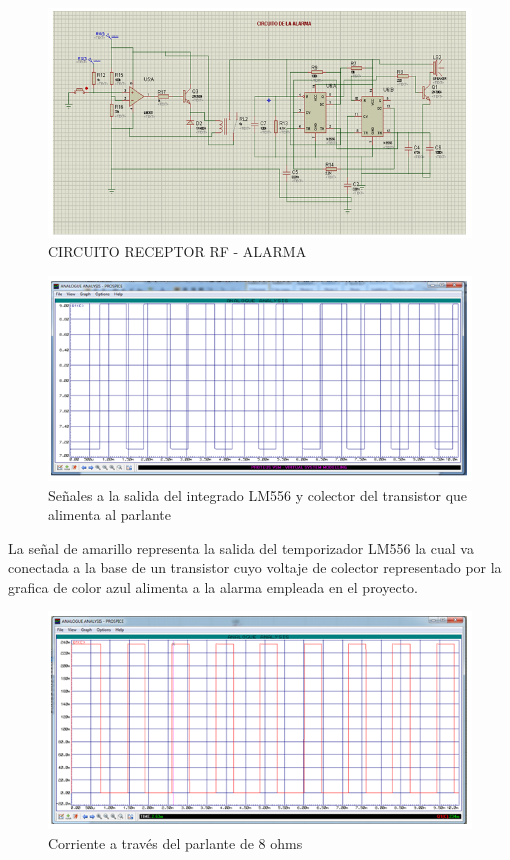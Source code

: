 \documentclass[a4paper,11pt]{article}
\begin{document}
\newpage
\begin{figure}[h]
	\caption{CIRCUITO RECEPTOR RF - ALARMA}
	\centering
	\includegraphics[width=0.8\linewidth]{./31}
\end{figure}


\begin{figure}[h]
	\caption{Señales a la salida del integrado LM556 y colector del transistor que alimenta al parlante}
	\centering
	\includegraphics[width=0.7\linewidth]{./32}
\end{figure}

La señal de amarillo representa la salida del temporizador LM556 la cual va conectada a la base de un transistor cuyo voltaje de colector representado por la grafica de color azul alimenta a la alarma empleada en el proyecto. 
\newpage

\begin{figure}[h]
	\caption{Corriente a través del parlante de 8 ohms}
	\centering
	\includegraphics[width=0.7\linewidth]{./33}
\end{figure}
\end{document}
